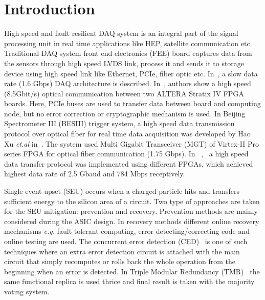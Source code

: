 \documentclass[a4paper]{jpconf}
\begin{document}
\section{Introduction}
\label{Introduction}
 High speed and fault resilient DAQ system is an integral part of the signal processing unit in real time applications like HEP, satellite communication etc. Traditional DAQ system front end electronics (FEE) board captures data from the sensors through high speed LVDS link, process it and sends it to storage device using high speed link like Ethernet, PCIe, fiber optic etc. In~\cite{Wang:iciea:2009}, a slow data rate (1.6 Gbps) DAQ architecture is described. In~\cite{kadric:socc:2012}, authors show a high speed (8.5Gbit/s) optical communication between two ALTERA Stratix IV FPGA boards. Here, PCIe buses are used to transfer data between board and computing node, but no error correction or cryptographic mechanism is used. 
In Beijing Spectrometer III (BESIII) trigger system, a high speed data transmission protocol over optical fiber for real time data acquisition was developed by Hao Xu \textit{et.al} in~\cite{haoxu:nss:2007:XX}. The system used Multi Gigabit Transceiver (MGT) of Virtex-II Pro series FPGA for optical fiber communication (1.75 Gbps). In ~\cite {mattihalli:cecnet:2012},~\cite{bohm:nss:mic:2012} a high speed data transfer protocol was implemented using different FPGAs, which achieved highest data rate of 2.5 Gbaud and 784 Mbps receptively.  
\par Single event upset (SEU) occurs when a charged particle hits and transfers sufficient energy to the silicon area of a circuit. Two type of approaches are taken for the SEU mitigation: prevention and recovery. Prevention methods are mainly considered during the ASIC design. In recovery methods different online recovery mechanisms \textit{e.g.} fault tolerant computing, error detecting/correcting code and online testing are used. The concurrent error detection (CED)~\cite{Siewiorek:CED} is one of such techniques where an extra error detection circuit is attached with the main circuit that simply recomputes or rolls back the whole operation from the beginning when an error is detected. In Triple Modular Redundancy (TMR)~\cite{TMR:IeeeTran:NuclrPhy} the same functional replica is used thrice and final result is taken with the majority voting system.
\end{document}
